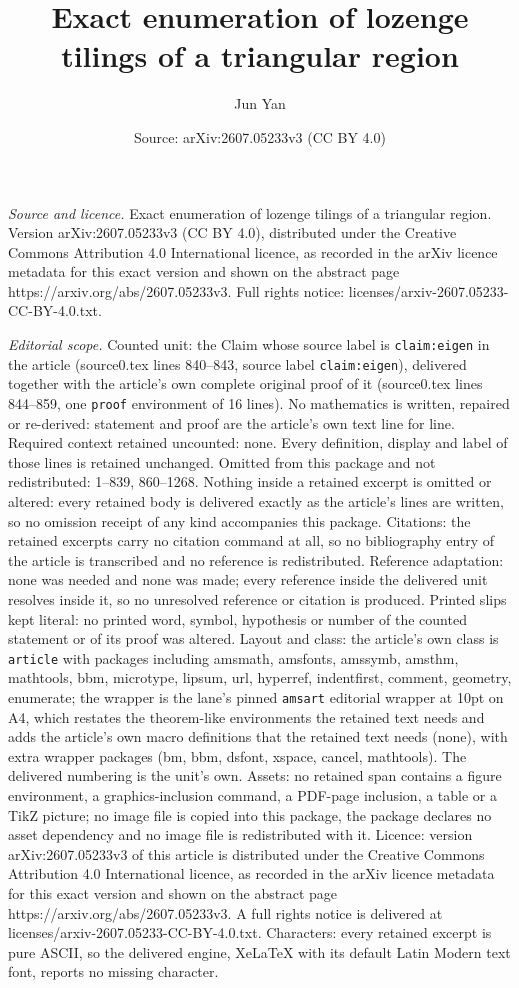 \documentclass[10pt,a4paper]{amsart}
\title[Exact enumeration of lozenge tilings of a triangular region]{Exact enumeration of lozenge tilings of a triangular region}
\author{Jun Yan}
\date{Source: arXiv:2607.05233v3 (CC BY 4.0)}
\begin{document}
\maketitle

\noindent\emph{Source and licence.} Exact enumeration of lozenge tilings of a triangular region. Version arXiv:2607.05233v3 (CC BY 4.0), distributed under the Creative Commons Attribution 4.0 International licence, as recorded in the arXiv licence metadata for this exact version and shown on the abstract page https://arxiv.org/abs/2607.05233v3. Full rights notice: licenses/arxiv-2607.05233-CC-BY-4.0.txt.\par\smallskip

\noindent\textit{Editorial scope.} Counted unit: the Claim whose source label is \texttt{claim:eigen} in the article (source0.tex lines 840--843, source label \texttt{claim:eigen}), delivered together with the article's own complete original proof of it (source0.tex lines 844--859, one \texttt{proof} environment of 16 lines). No mathematics is written, repaired or re-derived: statement and proof are the article's own text line for line. Required context retained uncounted: none. Every definition, display and label of those lines is retained unchanged. Omitted from this package and not redistributed: 1--839, 860--1268. Nothing inside a retained excerpt is omitted or altered: every retained body is delivered exactly as the article's lines are written, so no omission receipt of any kind accompanies this package. Citations: the retained excerpts carry no citation command at all, so no bibliography entry of the article is transcribed and no reference is redistributed. Reference adaptation: none was needed and none was made; every reference inside the delivered unit resolves inside it, so no unresolved reference or citation is produced. Printed slips kept literal: no printed word, symbol, hypothesis or number of the counted statement or of its proof was altered. Layout and class: the article's own class is \texttt{article} with packages including amsmath, amsfonts, amssymb, amsthm, mathtools, bbm, microtype, lipsum, url, hyperref, indentfirst, comment, geometry, enumerate; the wrapper is the lane's pinned \texttt{amsart} editorial wrapper at 10pt on A4, which restates the theorem-like environments the retained text needs and adds the article's own macro definitions that the retained text needs (none), with extra wrapper packages (bm, bbm, dsfont, xspace, cancel, mathtools). The delivered numbering is the unit's own. Assets: no retained span contains a figure environment, a graphics-inclusion command, a PDF-page inclusion, a table or a TikZ picture; no image file is copied into this package, the package declares no asset dependency and no image file is redistributed with it. Licence: version arXiv:2607.05233v3 of this article is distributed under the Creative Commons Attribution 4.0 International licence, as recorded in the arXiv licence metadata for this exact version and shown on the abstract page https://arxiv.org/abs/2607.05233v3. A full rights notice is delivered at licenses/arxiv-2607.05233-CC-BY-4.0.txt. Characters: every retained excerpt is pure ASCII, so the delivered engine, XeLaTeX with its default Latin Modern text font, reports no missing character.
\end{document}
